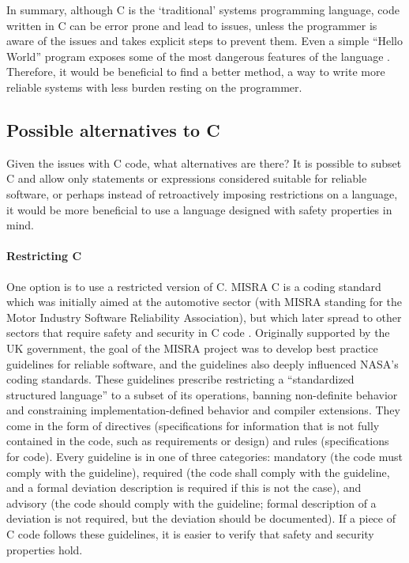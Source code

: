 In summary, although C is the `traditional' systems programming language, code written in C can be error prone and lead to issues, unless the programmer is aware of the issues and takes explicit steps to prevent them.
Even a simple ``Hello World'' program exposes some of the most dangerous features of the language \cite{milewski}.
Therefore, it would be beneficial to find a better method, a way to write more reliable systems with less burden resting on the programmer.

\subsection{Possible alternatives to C}
Given the issues with C code, what alternatives are there?
It is possible to subset C and allow only statements or expressions considered suitable for reliable software, or perhaps instead of retroactively imposing restrictions on a language, it would be more beneficial to use a language designed with safety properties in mind.

\paragraph{Restricting C}
One option is to use a restricted version of C.
MISRA C is a coding standard which was initially aimed at the automotive sector (with MISRA standing for the Motor Industry Software Reliability Association), but which later spread to other sectors that require safety and security in C code \cite{bagnara2018}.
Originally supported by the UK government, the goal of the MISRA project was to develop best practice guidelines for reliable software, and the guidelines also deeply influenced NASA's coding standards.
These guidelines prescribe restricting a ``standardized structured language'' to a subset of its operations, banning non-definite behavior and constraining implementation-defined behavior and compiler extensions.
They come in the form of directives (specifications for information that is not fully contained in the code, such as requirements or design) and rules (specifications for code).
Every guideline is in one of three categories: mandatory (the code must comply with the guideline), required (the code shall comply with the guideline, and a formal deviation description is required if this is not the case), and advisory (the code should comply with the guideline; formal description of a deviation is not required, but the deviation should be documented).
If a piece of C code follows these guidelines, it is easier to verify that safety and security properties hold.

